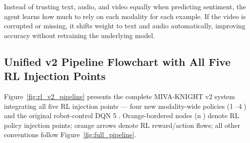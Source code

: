 \documentclass[12pt,a4paper]{article}
\theoremstyle{definition}
\theoremstyle{plain}
\theoremstyle{remark}
\begin{document}
\begin{tcolorbox}[laymanbox,title={In Plain Terms --- RL-Fusion}]
Instead of trusting text, audio, and video equally when predicting sentiment,
the agent learns how much to rely on each modality for each example.
If the video is corrupted or missing, it shifts weight to text and audio
automatically, improving accuracy without retraining the underlying model.
\end{tcolorbox}

\subsection{Unified v2 Pipeline Flowchart with All Five RL Injection Points}
\label{sec:rl_v2_flowchart}

Figure~\ref{fig:rl_v2_pipeline} presents the complete MIVA-KNIGHT v2 system
integrating all five RL injection points --- four new modality-wide policies
(\textcircled{1}--\textcircled{4}) and the original robot-control DQN
\textcircled{5}.  Orange-bordered nodes (\textcircled{n}) denote RL policy
injection points; orange arrows denote RL reward/action flows; all other
conventions follow Figure~\ref{fig:full_pipeline}.
\end{document}
